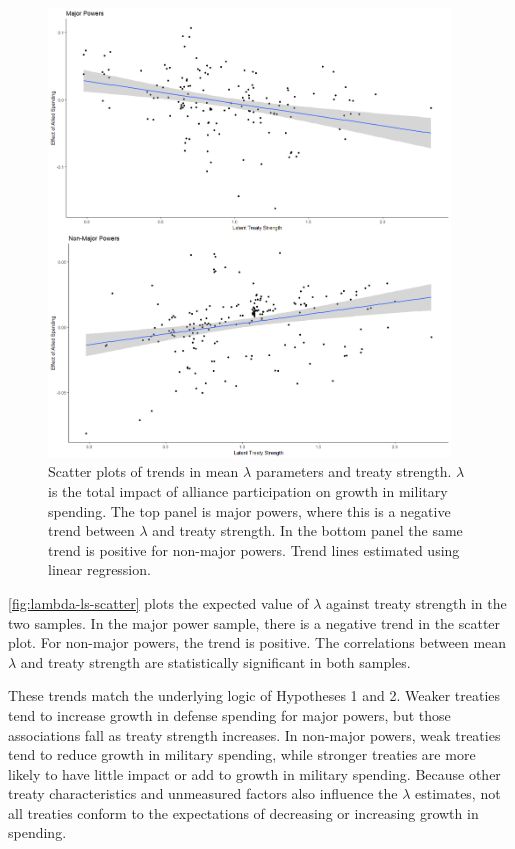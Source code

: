 \documentclass[12pt]{article}
\begin{document}
\begin{figure}[htbp]
	\centering
		\includegraphics[width=0.95\textwidth]{../figures/lambda-ls-scatter.png}
	\caption{Scatter plots of trends in mean $\lambda$ parameters and treaty strength. $\lambda$ is the total impact of alliance participation on growth in military spending. The top panel is major powers, where this is a negative trend between $\lambda$ and treaty strength. In the bottom panel the same trend is positive for non-major powers. Trend lines estimated using linear regression.}
	\label{fig:lambda-ls-scatter}
\end{figure}


\autoref{fig:lambda-ls-scatter} plots the expected value of $\lambda$ against treaty strength in the two samples. 
In the major power sample, there is a negative trend in the scatter plot.
For non-major powers, the trend is positive.
The correlations between mean $\lambda$ and treaty strength are statistically significant in both samples. 


These trends match the underlying logic of Hypotheses 1 and 2. 
Weaker treaties tend to increase growth in defense spending for major powers, but those associations fall as treaty strength increases. 
In non-major powers, weak treaties tend to reduce growth in military spending, while stronger treaties are more likely to have little impact or add to growth in military spending. 
Because other treaty characteristics and unmeasured factors also influence the $\lambda$ estimates, not all treaties conform to the expectations of decreasing or increasing growth in spending. 
\end{document}
